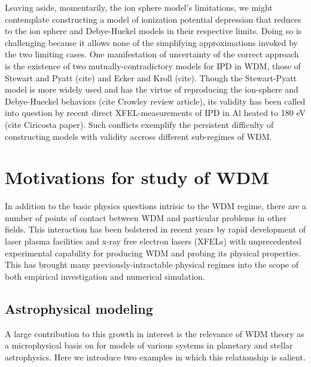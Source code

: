 \documentclass [11pt, proquest, article] {uwthesis}[2016/11/22]
\begin{document}

Leaving aside, momentarily, the ion sphere model's limitations, we might contemplate constructing a model of ionization potential depression that reduces to the ion sphere and Debye-Huekel models in their respective limits. Doing so is challenging because it allows none of the simplifying approximations invoked by the two limiting cases. One manifestation of uncertainty of the correct approach is the existence of two mutually-contradictory models for IPD in WDM, those of Stewart and Pyatt (cite) and Ecker and Kroll (cite). Though the Stewart-Pyatt model is more widely used and has the virtue of reproducing the ion-sphere and Debye-Hueckel behaviors (cite Crowley review article), its validity has been called into question by recent direct XFEL-measurements of IPD in Al heated to 180 eV (cite Ciricosta paper). Such conflicts exemplify the persistent difficulty of constructing models with validity accross different sub-regimes of WDM.


\section{Motivations for study of WDM}
In addition to the basic physics questions intrisic to the WDM regime, there are a number of points of contact between WDM and particular problems in other fields. This interaction has been bolstered in recent years by rapid development of laser plasma facilities and x-ray free electron lasers (XFELs) with unprecedented experimental capability for producing WDM and probing its physical properties. This has brought many previously-intractable physical regimes into the scope of both empirical investigation and numerical simulation.  

\subsection{Astrophysical modeling}
A large contribution to this growth in interest is the relevance of WDM theory as a microphysical basis on for models of various systems in planetary and stellar astrophysics. Here we introduce two examples in which this relationship is salient.
\end{document}
